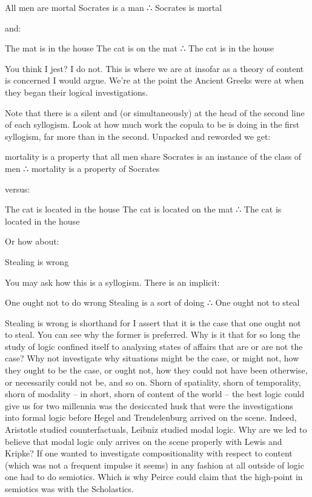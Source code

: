 \documentclass[dah,phd,a4paper]{xe_uccthesis}
\begin{document}
All men are mortal
Socrates is a man
∴ Socrates is mortal

and: 

The mat is in the house
The cat is on the mat
∴ The cat is in the house

You think I jest? I do not. This is where we are at insofar as a theory of content is concerned I would argue. We're at the point the Ancient Greeks were at when they began their logical investigations.

Note that there is a silent and (or simultaneously) at the head of the second line of each syllogism. Look at how much work the copula to be is doing in the first syllogism, far more than in the second. Unpacked and reworded we get:

mortality is a property that all men share
Socrates is an instance of the class of men
∴ mortality is a property of Socrates

versus:

The cat is located in the house
The cat is located on the mat
∴ The cat is located in the house

Or how about:

Stealing is wrong

You may ask how this is a syllogism. There is an implicit:

One ought not to do wrong
Stealing is a sort of doing
∴ One ought not to steal

Stealing is wrong is shorthand for I assert that it is the case that one ought not to steal. You can see why the former is preferred. Why is it that for so long the study of logic confined itself to analysing states of affairs that are or are not the case? Why not investigate why situations might be the case, or might not, how they ought to be the case, or ought not, how they could not have been otherwise, or necessarily could not be, and so on. Shorn of spatiality, shorn of temporality, shorn of modality – in short, shorn of content of the world – the best logic could give us for two millennia was the desiccated husk that were the investigations into formal logic before Hegel and Trendelenburg arrived on the scene. Indeed, Aristotle studied counterfactuals, Leibniz studied modal logic. Why are we led to believe that modal logic only arrives on the scene properly with Lewis and Kripke? If one wanted to investigate compositionality with respect to content (which was not a frequent impulse it seems) in any fashion at all outside of logic one had to do semiotics. Which is why Peirce could claim that the high-point in semiotics was with the Scholastics.
\end{document}
